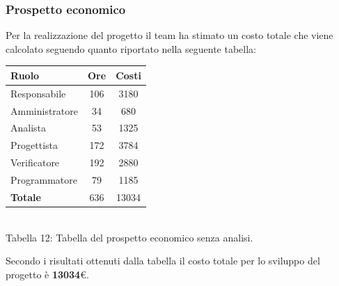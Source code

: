\subsubsection{Prospetto economico}
Per la realizzazione del progetto il team \gruppo{} ha stimato un costo totale che viene calcolato seguendo quanto riportato nella seguente tabella:
\begin{center}
\begin{tabular}{| l | c | c |}
\hline
Ruolo & Ore & Costi \\
\hline
Responsabile & 106 & 3180 \\
Amministratore & 34 & 680 \\
Analista & 53 & 1325\\
Progettista & 172 & 3784 \\
Verificatore & 192 & 2880 \\
Programmatore & 79 & 1185 \\
\hline
\textbf{Totale} & 636 & 13034 \\
\hline
\end{tabular}
\\
Tabella 12: Tabella del prospetto economico senza analisi.
\end{center}
Secondo i risultati ottenuti dalla tabella il costo totale per lo sviluppo del progetto è \textbf{13034}\euro .